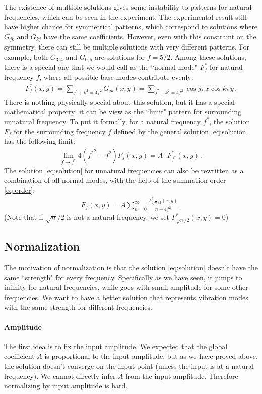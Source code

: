 \documentclass[]{article}
\begin{document}
The existence of multiple solutions gives some instability to patterns for natural frequencies, which can be seen in the experiment. The experimental result still have higher chance for symmetrical patterns, which correspond to solutions where $G_{jk}$ and $G_{kj}$ have the same coefficients. However, even with this constraint on the symmetry, there can still be multiple solutions with very different patterns. For example, both $G_{3,4}$ and $G_{0, 5}$ are solutions for $f=5/2$. Among these solutions, there is a special one that we would call as the ``normal mode" $F_f^*$ for natural frequency $f$, where all possible base modes contribute evenly:
\begin{align}
F_f^*(x, y) = \sum_{j^2+k^2=4f^2} G_{jk}(x, y) = \sum_{j^2+k^2=4f^2} \cos j\pi x \cos k\pi y\,.
\end{align}
There is nothing physically special about this solution, but it has a special mathematical property: it can be view as the ``limit" pattern for surrounding unnatural frequency. To put it formally, for a natural frequency $f^*$, the solution $F_f$ for the surrounding frequency $f$ defined by the general solution \eqref{eq:solution} has the following limit:
\begin{align}
\lim_{f\rightarrow f^*} 4({f^*}^2 - f^2)F_f(x, y) = A\cdot F_{f^*}^*(x, y)\,.\label{eq:limit}
\end{align}
The solution \eqref{eq:solution} for unnatural frequencies can also be rewritten as a combination of all normal modes, with the help of the summation order \eqref{eq:order}:
\begin{align}
F_f(x, y) = A\sum_{n=0}^\infty \frac{F_{\sqrt{n}/2}^*(x, y)}{n - 4f^2}\,.
\end{align}
(Note that if $\sqrt{n}/2$ is not a natural frequency, we set $F_{\sqrt{n}/2}^*(x, y) = 0$)

\subsection{Normalization}
The motivation of normalization is that the solution \eqref{eq:solution} doesn't have the same ``strength" for every frequency. Specifically as we have seen, it jumps to infinity for natural frequencies, while goes with small amplitude for some other frequencies. We want to have a better solution that represents vibration modes with the same strength for different frequencies.

\paragraph{Amplitude}
The first idea is to fix the input amplitude. We expected that the global coefficient $A$ is proportional to the input amplitude, but as we have proved above, the solution doesn't converge on the input point (unless the input is at a natural frequency). We cannot directly infer $A$ from the input amplitude. Therefore normalizing by input amplitude is hard.
\end{document}
